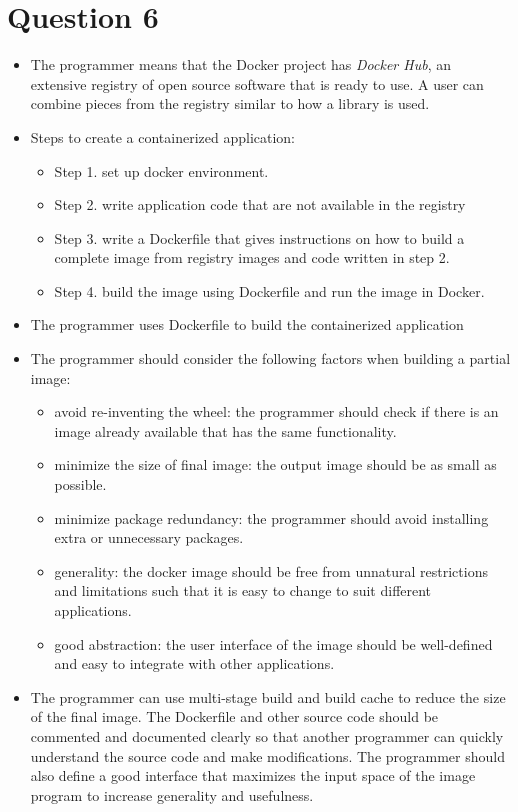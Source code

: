 \documentclass{article}
\begin{document}
\section{Question 6}
\begin{itemize}
\item The programmer means that the Docker project has \textit{Docker Hub}, an extensive registry of open source software that is ready to use. A user can combine pieces from the registry similar to how a library is used. 
\item Steps to create a containerized application:
    \begin{itemize}
    \item Step 1. set up docker environment.
    \item Step 2. write application code that are not available in the registry
    \item Step 3. write a Dockerfile that gives instructions on how to build a complete image from registry images and code written in step 2.
    \item Step 4. build the image using Dockerfile and run the image in Docker.
    \end{itemize}
\item The programmer uses Dockerfile to build the containerized application
\item The programmer should consider the following factors when building a partial image:
    \begin{itemize}
    \item avoid re-inventing the wheel: the programmer should check if there is an image already available that has the same functionality.
    \item minimize the size of final image: the output image should be as small as possible. 
    \item minimize package redundancy: the programmer should avoid installing extra or unnecessary packages.
    \item generality: the docker image should be free from unnatural restrictions and limitations such that it is easy to change to suit different applications.
    \item good abstraction: the user interface of the image should be well-defined and easy to integrate with other applications.
    \end{itemize}
\item The programmer can use multi-stage build and build cache to reduce the size of the final image. The Dockerfile and other source code should be commented and documented clearly so that another programmer can quickly understand the source code and make modifications. The programmer should also define a good interface that maximizes the input space of the image program to increase generality and usefulness.
\end{itemize}
\end{document}
